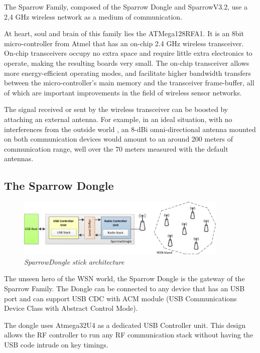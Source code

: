 The Sparrow Family, composed of the Sparrow Dongle and SparrowV3.2, use a 2,4 GHz wireless network as a medium of communication. 

At heart, soul and brain of this family lies the ATMega128RFA1. It is an 8bit micro-controller from Atmel that has an on-chip 2.4 GHz wireless transceiver. On-chip transceivers occupy no extra space and require little extra electronics to operate, making the resulting boards very small. The on-chip transceiver allows more energy-efficient operating modes, and facilitate higher bandwidth transfers between the micro-controller's main memory and the transceiver frame-buffer, all
of which are important improvements in the field of wireless sensor networks. 

The signal received or sent by the wireless transceiver can be boosted by attaching an external antenna. For example, in an ideal situation, with no interferences from the outside world , an 8-dBi omni-directional antenna mounted on both communication devices would amount to an around 200 meters of communication range, well over the 70 meters measured with the default antennas.

\subsection{The Sparrow Dongle}

\begin{figure}[ht]
\begin{center}
\includegraphics[width=0.9\textwidth]{hw_platform/donge_architecture.png}
\end{center}
\caption{\small \itshape{SparrowDongle stick architecture}}
\end{figure}

The unseen hero of the WSN world, the Sparrow Dongle is the gateway of the Sparrow Family. The Dongle can be connected to any device that has an USB port and can support USB CDC with ACM module (USB Communications Device Class with Abstract Control Mode). 

The dongle uses Atmega32U4 as a dedicated USB Controller unit. This design allows the RF controller to run any RF communication stack without having the USB code intrude on key timings.


